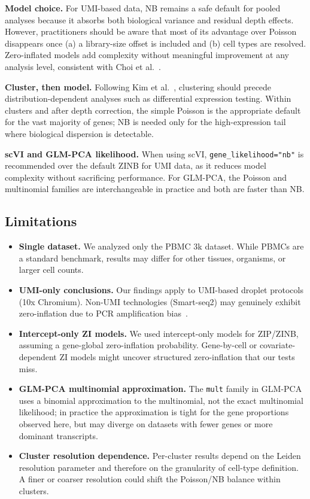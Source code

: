 \documentclass{article}
\begin{document}
\textbf{Model choice.}
For UMI-based data, NB remains a safe default for pooled analyses because it absorbs both biological variance and residual depth effects.
However, practitioners should be aware that most of its advantage over Poisson disappears once (a) a library-size offset is included and (b) cell types are resolved.
Zero-inflated models add complexity without meaningful improvement at any analysis level, consistent with Choi et al.~\cite{choi2020bayesian}.

\textbf{Cluster, then model.}
Following Kim et al.~\cite{kim2020demystifying}, clustering should precede distribution-dependent analyses such as differential expression testing.
Within clusters and after depth correction, the simple Poisson is the appropriate default for the vast majority of genes; NB is needed only for the high-expression tail where biological dispersion is detectable.

\textbf{scVI and GLM-PCA likelihood.}
When using scVI, \texttt{gene\_likelihood="nb"} is recommended over the default ZINB for UMI data, as it reduces model complexity without sacrificing performance.
For GLM-PCA, the Poisson and multinomial families are interchangeable in practice and both are faster than NB.

\subsection{Limitations}

\begin{itemize}[nosep]
\item \textbf{Single dataset.}
  We analyzed only the PBMC 3k dataset.  While PBMCs are a standard benchmark, results may differ for other tissues, organisms, or larger cell counts.

\item \textbf{UMI-only conclusions.}
  Our findings apply to UMI-based droplet protocols (10x Chromium).  Non-UMI technologies (Smart-seq2) may genuinely exhibit zero-inflation due to PCR amplification bias~\cite{jiang2022statistics}.

\item \textbf{Intercept-only ZI models.}
  We used intercept-only models for ZIP/ZINB, assuming a gene-global zero-inflation probability.  Gene-by-cell or covariate-dependent ZI models might uncover structured zero-inflation that our tests miss.

\item \textbf{GLM-PCA multinomial approximation.}
  The \texttt{mult} family in GLM-PCA uses a binomial approximation to the multinomial, not the exact multinomial likelihood; in practice the approximation is tight for the gene proportions observed here, but may diverge on datasets with fewer genes or more dominant transcripts.

\item \textbf{Cluster resolution dependence.}
  Per-cluster results depend on the Leiden resolution parameter and therefore on the granularity of cell-type definition.  A finer or coarser resolution could shift the Poisson/NB balance within clusters.
\end{itemize}
\end{document}
